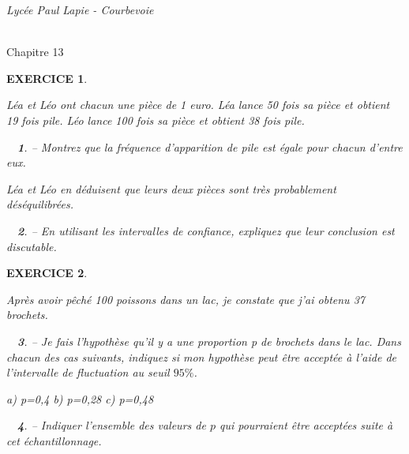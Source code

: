 \documentclass[a4paper]{article}   %
\renewcommand{\(}{\left(}
\renewcommand{\)}{\right)}
\newtheorem{ques}{~}
\newenvironment{qu}{\begin{ques}--} {\end{ques}}
\newtheorem{EXO}{\large EXERCICE }
\newenvironment{EX}   { \setcounter{ques}{0} \begin{EXO} \hrulefill ~\vspace{0.3cm}

\normalfont}    {\end{EXO} \medskip}
\def\cl{{\Large \bf{2nde}}}
\begin{document}
\newpage \setcounter{EXO}{0}

\noindent\begin{minipage}{.20\linewidth}\begin{center}                  
\noindent \emph{Lycée Paul Lapie - Courbevoie}
\end{center}\end{minipage}
\begin{minipage}{1.5\linewidth}\begin{center}	
\noindent \cl\\ Chapitre 13
\end{center}\end{minipage}

\begin{center} 	
\end{center}

\begin{EX}
Léa et Léo ont chacun une pièce de 1 euro. Léa lance 50 fois sa pièce et obtient 19 fois pile. Léo lance 100 fois sa pièce et obtient 38 fois pile. 
\begin{qu} Montrez que la fréquence d'apparition de pile est égale pour chacun d'entre eux. 
\end{qu}
Léa et Léo en déduisent que leurs deux pièces sont très probablement déséquilibrées. 
\begin{qu} En utilisant les intervalles de confiance, expliquez que leur conclusion est discutable.
\end{qu}
\end{EX}

\begin{EX}
Après avoir pêché 100 poissons dans un lac, je constate que j'ai obtenu 37 brochets.
\begin{qu} Je fais l'hypothèse qu'il y a une proportion p de brochets dans le lac. Dans chacun des cas suivants, indiquez si mon hypothèse peut être acceptée à l'aide de l'intervalle de fluctuation au seuil $95\%$. 
\begin{center}
a) p=0,4 \hspace{3cm} b) p=0,28 \hspace{3cm} c) p=0,48
\end{center}
\end{qu}
\begin{qu} Indiquer l'ensemble des valeurs de $p$ qui pourraient être acceptées suite à cet échantillonnage.
\end{qu}
\end{EX}
\end{document}
